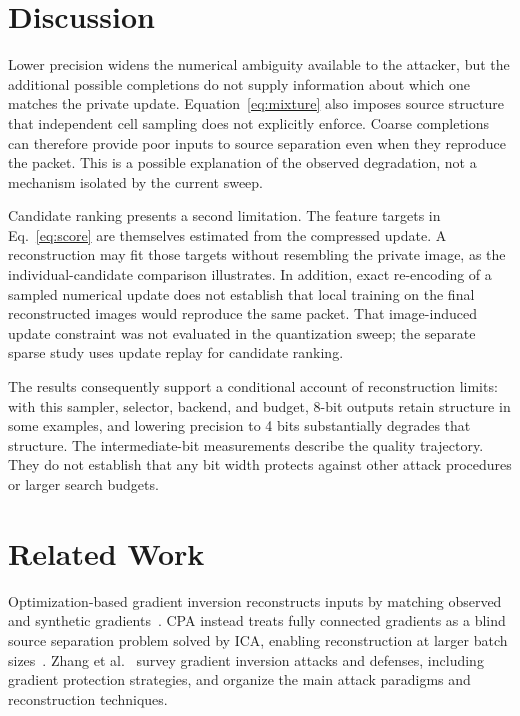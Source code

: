 \documentclass{article}
\begin{document}
\section{Discussion}
\label{sec:discussion}
Lower precision widens the numerical ambiguity available to the attacker,
but the additional possible completions do not supply information about
which one matches the private update. Equation~\ref{eq:mixture} also
imposes source structure that independent cell sampling does not
explicitly enforce. Coarse completions can therefore provide poor
inputs to source separation even when they reproduce the packet.
This is a possible explanation of the observed degradation, not a
mechanism isolated by the current sweep.

Candidate ranking presents a second limitation. The feature targets in
Eq.~\ref{eq:score} are themselves estimated from the compressed update.
A reconstruction may fit those targets without resembling the private
image, as the individual-candidate comparison illustrates. In addition,
exact re-encoding of a sampled numerical update does not establish that
local training on the final reconstructed images would reproduce the
same packet. That image-induced update constraint was not evaluated in
the quantization sweep; the separate sparse study uses update replay
for candidate ranking.

The results consequently support a conditional account of reconstruction
limits: with this sampler, selector, backend, and budget, 8-bit outputs
retain structure in some examples, and lowering precision to 4 bits
substantially degrades that structure. The intermediate-bit measurements
describe the quality trajectory. They do not establish that any bit
width protects against other attack procedures or larger search budgets.

\section{Related Work}
\label{sec:related}
Optimization-based gradient inversion reconstructs inputs by matching
observed and synthetic gradients~\cite{zhu2019deep,geiping2020inverting}.
CPA instead treats fully connected gradients as a blind source separation
problem solved by ICA, enabling reconstruction at larger batch
sizes~\cite{kariyappa2023cocktail}. Zhang et al.~\cite{zhang2022survey}
survey gradient inversion attacks and defenses, including gradient
protection strategies, and organize the main attack paradigms and
reconstruction techniques.
\end{document}
